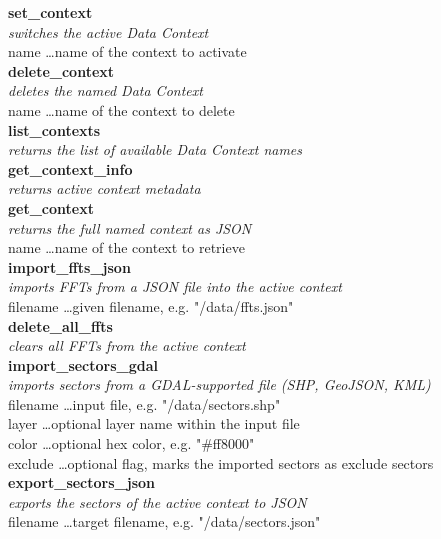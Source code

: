 \textbf{set\_context} \\
\textit{switches the active Data Context} \\
name \dots name of the context to activate \\

\textbf{delete\_context} \\
\textit{deletes the named Data Context} \\
name \dots name of the context to delete \\

\textbf{list\_contexts} \\
\textit{returns the list of available Data Context names} \\

\textbf{get\_context\_info} \\
\textit{returns active context metadata} \\

\textbf{get\_context} \\
\textit{returns the full named context as JSON} \\
name \dots name of the context to retrieve \\

\textbf{import\_ffts\_json} \\
\textit{imports FFTs from a JSON file into the active context} \\
filename \dots given filename, e.g. "/data/ffts.json" \\

\textbf{delete\_all\_ffts} \\
\textit{clears all FFTs from the active context} \\

\textbf{import\_sectors\_gdal} \\
\textit{imports sectors from a GDAL-supported file (SHP, GeoJSON, KML)} \\
filename \dots input file, e.g. "/data/sectors.shp" \\
layer \dots optional layer name within the input file \\
color \dots optional hex color, e.g. "\#ff8000" \\
exclude \dots optional flag, marks the imported sectors as exclude sectors \\

\textbf{export\_sectors\_json} \\
\textit{exports the sectors of the active context to JSON} \\
filename \dots target filename, e.g. "/data/sectors.json" \\


